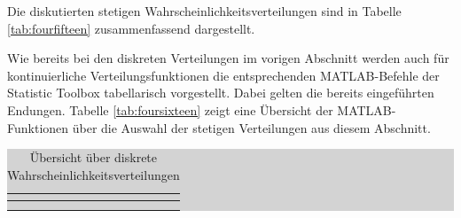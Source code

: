 \noindent Die diskutierten stetigen Wahrscheinlichkeitsverteilungen sind in Tabelle \ref{tab:fourfifteen} zusammenfassend dargestellt.

\noindent Wie bereits bei den diskreten Verteilungen im vorigen Abschnitt werden auch f\"{u}r kontinuierliche Verteilungsfunktionen die entsprechenden MATLAB-Befehle der Statistic Toolbox tabellarisch vorgestellt. Dabei gelten die bereits eingef\"{u}hrten Endungen. Tabelle \ref{tab:foursixteen} zeigt eine \"{U}bersicht der MATLAB-Funktionen \"{u}ber die Auswahl der stetigen Verteilungen aus diesem Abschnitt.

\clearpage

\begin{table}[H]
\setlength{\arrayrulewidth}{.1em}
\caption{\"{U}bersicht \"{u}ber diskrete Wahrscheinlichkeitsverteilungen}
\setlength{\fboxsep}{0pt}%
\colorbox{lightgray}{%
%
\begin{tabular}{| c | c | c |}
\hline
\parbox[c][0.3in][c]{1.9in}{\smallskip\centering\textbf{\selectfont{Name und Anwendung}}} &
\parbox[c][0.3in][c]{2.6in}{\smallskip\centering\textbf{\selectfont{Wahrscheinlichkeitsverteilung}}} &
\parbox[c][0.3in][c]{1.9in}{\smallskip\centering\textbf{}}\\ \hline

\parbox[c][1.2in][c]{1.9in}{\centering{}\selectfont{Gleichverteilung: \newline
\\
Beschreibung von Wartezeiten und Diskretisierungsvorgängen
}} & 
\parbox[c][1.2in][c]{2.6in}{\centering{}} &
\parbox[c][1.2in][c]{1.9in}{\centering{}}\\
\hline

\parbox[c][1.2in][c]{1.9in}{\centering{}\selectfont{Symmetrische 
Dreiecksverteilung:\newline
\\
Toleranzverteilung bei Fertigungsprozessen}} & 
\parbox[c][1.2in][c]{2.6in}{\centering{}} &
\parbox[c][1.2in][c]{1.9in}{\centering{}}
\end{tabular}}
\end{table}
